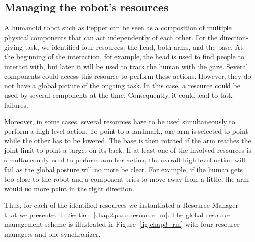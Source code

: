 \documentclass[a4paper,11pt,twoside]{StyleThese}
\begin{document}
\subsection{Managing the robot's resources}

A humanoid robot such as Pepper can be seen as a composition of multiple physical components that can act independently of each other. For the direction-giving task, we identified four resources: the head, both arms, and the base. At the beginning of the interaction, for example, the head is used to find people to interact with, but later it will be used to track the human with the gaze. Several components could access this resource to perform these actions. However, they do not have a global picture of the ongoing task. In this case, a resource could be used by several components at the time. Consequently, it could lead to task failures.

Moreover, in some cases, several resources have to be used simultaneously to perform a high-level action. To point to a landmark, one arm is selected to point while the other has to be lowered. The base is then rotated if the arm reaches the joint limit to point a target on its back. If at least one of the involved resources is simultaneously used to perform another action, the overall high-level action will fail as the global posture will no more be clear. For example, if the human gets too close to the robot and a component tries to move away from a little, the arm would no more point in the right direction.

Thus, for each of the identified resources we instantiated a Resource Manager that we presented in Section~\ref{chap2:para:resource_m}. The global resource management scheme is illustrated in Figure~\ref{fig:chap3_rm} with four resource managers and one synchronizer.
\end{document}
